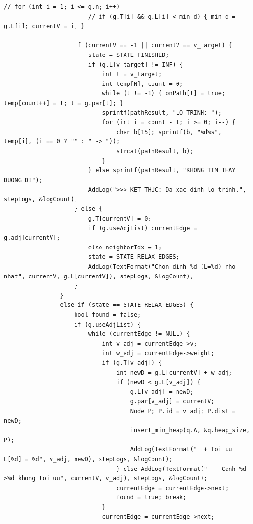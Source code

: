 \documentclass[12pt,a4paper,oneside]{report}
\begin{document}
\begin{lstlisting}[style=UserCStyle]
                    // for (int i = 1; i <= g.n; i++)
                        // if (g.T[i] && g.L[i] < min_d) { min_d = g.L[i]; currentV = i; }

                    if (currentV == -1 || currentV == v_target) {
                        state = STATE_FINISHED;
                        if (g.L[v_target] != INF) {
                            int t = v_target;
                            int temp[N], count = 0;
                            while (t != -1) { onPath[t] = true; temp[count++] = t; t = g.par[t]; }
                            sprintf(pathResult, "LO TRINH: ");
                            for (int i = count - 1; i >= 0; i--) {
                                char b[15]; sprintf(b, "%d%s", temp[i], (i == 0 ? "" : " -> "));
                                strcat(pathResult, b);
                            }
                        } else sprintf(pathResult, "KHONG TIM THAY DUONG DI");
                        AddLog(">>> KET THUC: Da xac dinh lo trinh.", stepLogs, &logCount);
                    } else {
                        g.T[currentV] = 0; 
                        if (g.useAdjList) currentEdge = g.adj[currentV];
                        else neighborIdx = 1; 
                        state = STATE_RELAX_EDGES;
                        AddLog(TextFormat("Chon dinh %d (L=%d) nho nhat", currentV, g.L[currentV]), stepLogs, &logCount);
                    }
                } 
                else if (state == STATE_RELAX_EDGES) {
                    bool found = false;
                    if (g.useAdjList) {
                        while (currentEdge != NULL) {
                            int v_adj = currentEdge->v;
                            int w_adj = currentEdge->weight;
                            if (g.T[v_adj]) {
                                int newD = g.L[currentV] + w_adj;
                                if (newD < g.L[v_adj]) {
                                    g.L[v_adj] = newD;
                                    g.par[v_adj] = currentV;
                                    Node P; P.id = v_adj; P.dist = newD;
                                    insert_min_heap(q.A, &q.heap_size, P);
                                    AddLog(TextFormat("  + Toi uu L[%d] = %d", v_adj, newD), stepLogs, &logCount);
                                } else AddLog(TextFormat("  - Canh %d->%d khong toi uu", currentV, v_adj), stepLogs, &logCount);
                                currentEdge = currentEdge->next; 
                                found = true; break;
                            }
                            currentEdge = currentEdge->next;

\end{lstlisting}
\end{document}

